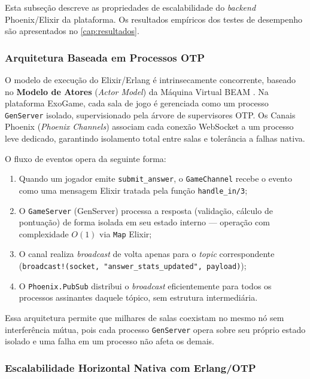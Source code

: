 \documentclass[
	12pt,
	openany,
	oneside,
	a4paper,
	english,
	brazil
]{abntex2}
\begin{document}
Esta subseção descreve as propriedades de escalabilidade do \textit{backend} Phoenix/Elixir da plataforma. Os resultados empíricos dos testes de desempenho são apresentados no \autoref{cap:resultados}.

\subsubsection{Arquitetura Baseada em Processos OTP}

O modelo de execução do Elixir/Erlang é intrinsecamente concorrente, baseado no \textbf{Modelo de Atores} (\textit{Actor Model}) da Máquina Virtual BEAM \cite{armstrong2013}. Na plataforma ExoGame, cada sala de jogo é gerenciada como um processo \texttt{GenServer} isolado, supervisionado pela árvore de supervisores OTP. Os Canais Phoenix (\textit{Phoenix Channels}) associam cada conexão WebSocket a um processo leve dedicado, garantindo isolamento total entre salas e tolerância a falhas nativa.

O fluxo de eventos opera da seguinte forma:

\begin{enumerate}
  \item Quando um jogador emite \texttt{submit\_answer}, o \texttt{GameChannel} recebe o evento como uma mensagem Elixir tratada pela função \texttt{handle\_in/3};
  \item O \texttt{GameServer} (GenServer) processa a resposta (validação, cálculo de pontuação) de forma isolada em seu estado interno --- operação com complexidade $O(1)$ via \texttt{Map} Elixir;
  \item O canal realiza \textit{broadcast} de volta apenas para o \textit{topic} correspondente (\texttt{broadcast!(socket, "answer\_stats\_updated", payload)});
  \item O \texttt{Phoenix.PubSub} distribui o \textit{broadcast} eficientemente para todos os processos assinantes daquele tópico, sem estrutura intermediária.
\end{enumerate}

Essa arquitetura permite que milhares de salas coexistam no mesmo nó sem interferência mútua, pois cada processo \texttt{GenServer} opera sobre seu próprio estado isolado e uma falha em um processo não afeta os demais.

\subsubsection{Escalabilidade Horizontal Nativa com Erlang/OTP}
\end{document}
